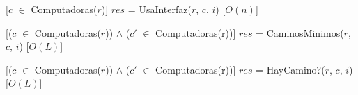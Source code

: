   [$c$ $\in$ Computadoras($r$)]
  {$res$ = UsaInterfaz($r$, $c$, $i$)}
  [$O(n)$]

  [($c$ $\in$ Computadoras($r$)) $\land$ ($c'$ $\in$ Computadoras(r))]
  {$res$ = CaminosMinimos($r$, $c$, $i$)}
  [$O(L)$]

  [($c$ $\in$ Computadoras($r$)) $\land$ ($c'$ $\in$ Computadoras(r))]
  {$res$ = HayCamino?($r$, $c$, $i$)}
  [$O(L)$]



